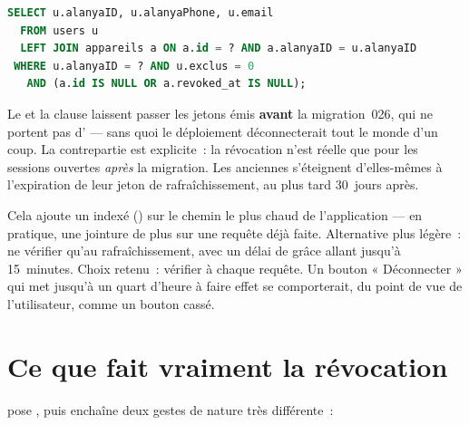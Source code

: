 \begin{lstlisting}[language=SQL, caption={La jointure commune aux trois gardes}]
SELECT u.alanyaID, u.alanyaPhone, u.email
  FROM users u
  LEFT JOIN appareils a ON a.id = ? AND a.alanyaID = u.alanyaID
 WHERE u.alanyaID = ? AND u.exclus = 0
   AND (a.id IS NULL OR a.revoked_at IS NULL);
\end{lstlisting}

\begin{note}
Le  et la clause  laissent passer les jetons émis
\textbf{avant} la migration~026, qui ne portent pas d' --- sans quoi le
déploiement déconnecterait tout le monde d'un coup. La contrepartie est explicite~: la
révocation n'est réelle que pour les sessions ouvertes \emph{après} la migration. Les
anciennes s'éteignent d'elles-mêmes à l'expiration de leur jeton de rafraîchissement, au
plus tard 30~jours après.
\end{note}

\begin{note}
Cela ajoute un  indexé () sur le chemin le plus
chaud de l'application --- en pratique, une jointure de plus sur une requête déjà faite.
Alternative plus légère~: ne vérifier qu'au rafraîchissement, avec un délai de grâce allant
jusqu'à 15~minutes. Choix retenu~: vérifier à chaque requête. Un bouton « Déconnecter » qui
met jusqu'à un quart d'heure à faire effet se comporterait, du point de vue de
l'utilisateur, comme un bouton cassé.
\end{note}

\section{Ce que fait vraiment la révocation}

 pose , puis enchaîne
deux gestes de nature très différente~:

